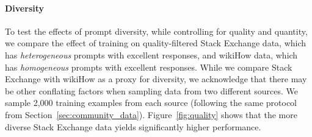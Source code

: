        



\paragraph{Diversity}
To test the effects of prompt diversity, while controlling for quality and quantity, we compare the effect of training on quality-filtered Stack Exchange data, which has \textit{heterogeneous} prompts with excellent responses, and wikiHow data, which has \textit{homogeneous} prompts with excellent responses.
While we compare Stack Exchange with wikiHow as a proxy for diversity, we acknowledge that there may be other conflating factors when sampling data from two different sources.
We sample 2,000 training examples from each source (following the same protocol from Section~\ref{sec:community_data}).
Figure~\ref{fig:quality} shows that the more diverse Stack Exchange data yields significantly higher performance.

